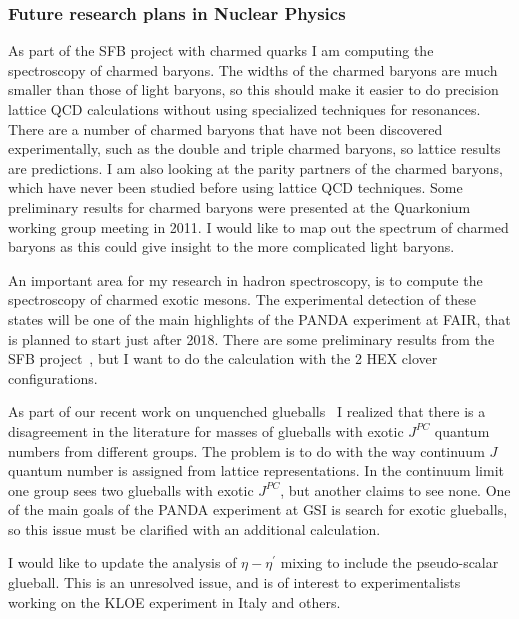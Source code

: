 \subsubsection{Future research plans in Nuclear Physics}


As part of the SFB project with charmed quarks I am computing the spectroscopy
of charmed baryons. The widths of the charmed baryons are much smaller
than those of light baryons, so this should make it easier to
do precision lattice QCD calculations without using specialized
techniques for resonances. There are a number of charmed baryons that 
have not been discovered experimentally, such as the double and 
triple charmed baryons, so lattice results are predictions.
I am also looking at the parity
partners of the charmed baryons, which have never been studied
before using lattice QCD techniques.
Some preliminary results for charmed baryons were presented at the 
Quarkonium working group meeting
in 2011. I would like to map out the spectrum of 
charmed baryons as this could give insight to the more
complicated light baryons.


An important area for my research in hadron spectroscopy,
is to compute the spectroscopy of charmed exotic
mesons. The experimental detection of these states will be
one of the main highlights of the PANDA experiment at FAIR,
that is planned to start just after 2018. There are some
preliminary results from the SFB project~\cite{Bali:2011dc},
but I want to do the calculation with the 2 HEX clover configurations.


As part of our recent work on 
unquenched glueballs~\cite{Gregory:2012hu}
I realized that
there is a disagreement in the literature for masses of glueballs
with exotic $J^{PC}$ quantum numbers from different groups.
The problem is to do with the way continuum $J$ quantum number
is assigned from lattice representations. In the continuum limit
one group sees two glueballs with exotic $J^{PC}$, but another 
claims to see none. One of the main goals of the PANDA experiment
at GSI is search for exotic glueballs, so this issue must be clarified
with an additional calculation.

I would like to update the analysis of $\eta-\eta^\prime$ mixing
to include the pseudo-scalar glueball. This is an unresolved issue,
and is of interest to experimentalists working on the KLOE
experiment in Italy and others.


